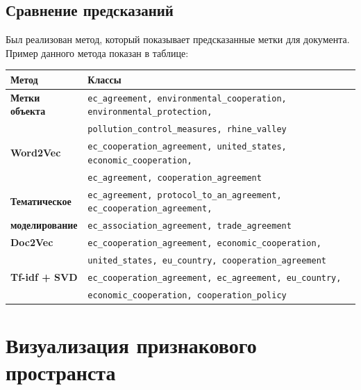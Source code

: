 \documentclass[12pt, a4paper]{article}
\begin{document}
        \subsection{Сравнение предсказаний}
            Был реализован метод, который показывает предсказанные метки для документа. Пример данного метода показан в таблице:
            \begin{center}
            \begin{tabular}{| l | l |}
                \hline
                \textbf{Метод} & \textbf{Классы}\\
                \hline
                \textbf{Метки объекта} & \texttt{ec\_agreement, environmental\_cooperation, environmental\_protection,}\\
                &\texttt{pollution\_control\_measures, rhine\_valley}\\
                \hline
                \textbf{Word2Vec} & \texttt{ec\_cooperation\_agreement, united\_states, economic\_cooperation,}\\
                &\texttt{ec\_agreement, cooperation\_agreement }\\
                \hline
                \textbf{Тематическое} & \texttt{ec\_agreement, protocol\_to\_an\_agreement, ec\_cooperation\_agreement,} \\
                \textbf{моделирование} & \texttt{ec\_association\_agreement, trade\_agreement }\\
                \hline
                \textbf{Doc2Vec} & \texttt{ec\_cooperation\_agreement, economic\_cooperation,} \\
                &\texttt{united\_states, eu\_country, cooperation\_agreement }\\
                \hline
                \textbf{Tf-idf + SVD} & \texttt{ec\_cooperation\_agreement, ec\_agreement, eu\_country,} \\
                &\texttt{economic\_cooperation, cooperation\_policy }\\
                \hline
            \end{tabular}
            \end{center}

    \section{Визуализация признакового пространста}
\end{document}
